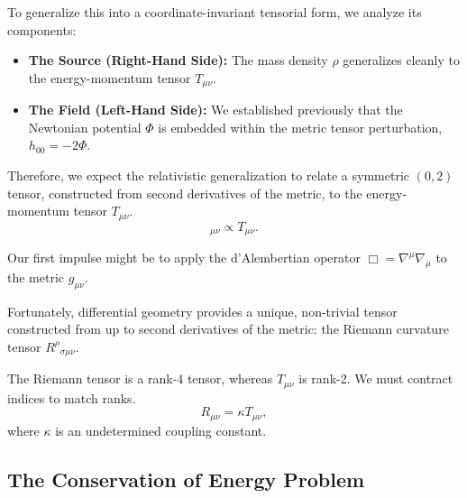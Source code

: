 \documentclass[11pt, a4paper]{report}
\begin{document}
To generalize this into a coordinate-invariant tensorial form, we analyze its components: %
\begin{itemize}
    \item \textbf{The Source (Right-Hand Side):} The mass density $\rho$ generalizes cleanly to the energy-momentum tensor $T_{\mu\nu}$. %
    \item \textbf{The Field (Left-Hand Side):} We established previously that the Newtonian potential $\Phi$ is embedded within the metric tensor perturbation, $h_{00} = -2\Phi$. %
\end{itemize}

Therefore, we expect the relativistic generalization to relate a symmetric $(0, 2)$ tensor, constructed from second derivatives of the metric, to the energy-momentum tensor $T_{\mu\nu}$. %
\begin{equation}
[\nabla^{2}g]_{\mu\nu} \propto T_{\mu\nu}. %
\end{equation}

Our first impulse might be to apply the d'Alembertian operator $\Box = \nabla^{\mu}\nabla_{\mu}$ to the metric $g_{\mu\nu}$. %

Fortunately, differential geometry provides a unique, non-trivial tensor constructed from up to second derivatives of the metric: the Riemann curvature tensor ${R^{\rho}}_{\sigma\mu\nu}$. %

The Riemann tensor is a rank-4 tensor, whereas $T_{\mu\nu}$ is rank-2. We must contract indices to match ranks. %
\begin{equation}
\label{eq:naive_einstein}
R_{\mu\nu} = \kappa T_{\mu\nu}, %
\end{equation}
where $\kappa$ is an undetermined coupling constant. %

\subsection{The Conservation of Energy Problem}
\end{document}
